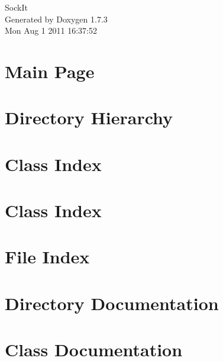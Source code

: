\documentclass[a4paper]{book}
\begin{document}
\hypersetup{pageanchor=false}
\begin{titlepage}
\vspace*{7cm}
\begin{center}
{\Large SockIt }\\
\vspace*{1cm}
{\large Generated by Doxygen 1.7.3}\\
\vspace*{0.5cm}
{\small Mon Aug 1 2011 16:37:52}\\
\end{center}
\end{titlepage}
\clearemptydoublepage
{}
\tableofcontents
\clearemptydoublepage
{}
\hypersetup{pageanchor=true}
\chapter{Main Page}
\label{index}\hypertarget{index}{}
\chapter{Directory Hierarchy}

\chapter{Class Index}

\chapter{Class Index}

\chapter{File Index}

\chapter{Directory Documentation}







\chapter{Class Documentation}

















\end{document}

